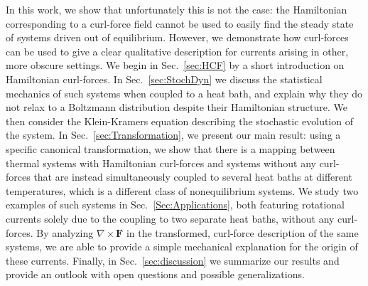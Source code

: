 In this work, we show that unfortunately this is not the case: the Hamiltonian corresponding to a curl-force field cannot be used to easily find the steady state of systems driven out of equilibrium. However, we demonstrate how curl-forces can be used to give a clear qualitative description for currents arising in other, more obscure settings.
We begin in Sec.~\ref{sec:HCF} by a short introduction on Hamiltonian curl-forces. In Sec.~\ref{sec:StochDyn} we discuss the statistical mechanics of such systems when coupled to a heat bath, and explain why they do not relax to a Boltzmann distribution despite their Hamiltonian structure. We then consider the Klein-Kramers equation describing the stochastic evolution of the system.
In Sec.~\ref{sec:Transformation}, we present our main result: using a specific canonical transformation, we show that there is a mapping between thermal systems with Hamiltonian curl-forces and systems without any curl-forces that are instead simultaneously coupled to several heat baths at different temperatures, which is a different class of nonequilibrium systems. We study two examples of such systems in Sec.~\ref{Sec:Applications}, both featuring rotational currents solely due to the coupling to two separate heat baths, without any curl-forces. By analyzing $\nabla \times \mathbf{F}$ in the transformed, curl-force description of the same systems, we are able to provide a simple mechanical explanation for the origin of these currents. Finally, in Sec.~\ref{sec:discussion} we summarize our results and provide an outlook with open questions and possible generalizations.
